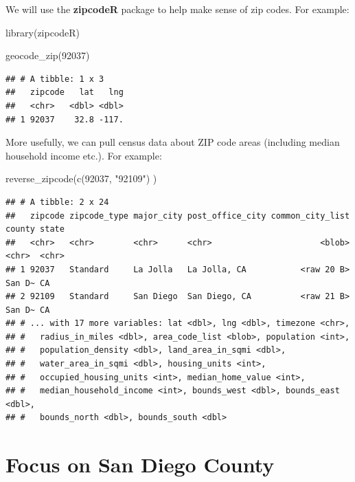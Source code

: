 \documentclass[
]{article}
\newenvironment{Shaded}{\begin{snugshade}}{\end{snugshade}}
\newcommand{\FunctionTok}[1]{\textcolor[rgb]{0.00,0.00,0.00}{#1}}
\newcommand{\NormalTok}[1]{#1}
\newcommand{\StringTok}[1]{\textcolor[rgb]{0.31,0.60,0.02}{#1}}
\begin{document}
We will use the \textbf{zipcodeR} package to help make sense of zip
codes. For example:

\begin{Shaded}
\begin{Highlighting}[]
\FunctionTok{library}\NormalTok{(zipcodeR)}

\FunctionTok{geocode\_zip}\NormalTok{(}\StringTok{\textquotesingle{}92037\textquotesingle{}}\NormalTok{)}
\end{Highlighting}
\end{Shaded}

\begin{verbatim}
## # A tibble: 1 x 3
##   zipcode   lat   lng
##   <chr>   <dbl> <dbl>
## 1 92037    32.8 -117.
\end{verbatim}

More usefully, we can pull census data about ZIP code areas (including
median household income etc.). For example:

\begin{Shaded}
\begin{Highlighting}[]
\FunctionTok{reverse\_zipcode}\NormalTok{(}\FunctionTok{c}\NormalTok{(}\StringTok{\textquotesingle{}92037\textquotesingle{}}\NormalTok{, }\StringTok{"92109"}\NormalTok{) )}
\end{Highlighting}
\end{Shaded}

\begin{verbatim}
## # A tibble: 2 x 24
##   zipcode zipcode_type major_city post_office_city common_city_list county state
##   <chr>   <chr>        <chr>      <chr>                      <blob> <chr>  <chr>
## 1 92037   Standard     La Jolla   La Jolla, CA           <raw 20 B> San D~ CA   
## 2 92109   Standard     San Diego  San Diego, CA          <raw 21 B> San D~ CA   
## # ... with 17 more variables: lat <dbl>, lng <dbl>, timezone <chr>,
## #   radius_in_miles <dbl>, area_code_list <blob>, population <int>,
## #   population_density <dbl>, land_area_in_sqmi <dbl>,
## #   water_area_in_sqmi <dbl>, housing_units <int>,
## #   occupied_housing_units <int>, median_home_value <int>,
## #   median_household_income <int>, bounds_west <dbl>, bounds_east <dbl>,
## #   bounds_north <dbl>, bounds_south <dbl>
\end{verbatim}

\hypertarget{focus-on-san-diego-county}{%
\section{Focus on San Diego County}\label{focus-on-san-diego-county}}
\end{document}
